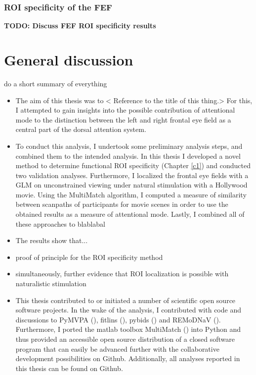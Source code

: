 \documentclass[a4paper, 12pt]{scrreprt}
\begin{document}
\subsection{ROI specificity of the FEF}
\textbf{TODO: Discuss FEF ROI specificity results}

\chapter{General discussion}\label{section:discussion}
do a short summary of everything

\begin{itemize}
	\item The aim of this thesis was to < Reference to the title of this thing.> For this, I attempted to gain insights into the possible contribution of attentional mode to the distinction between the left and right frontal eye field as a central part of the dorsal attention system.
	\item To conduct this analysis, I undertook some preliminary analysis steps, and combined them to the intended analysis. In this thesis I developed a novel method to determine functional ROI specificity (Chapter \ref{c1}) and conducted two validation analyses. Furthermore, I localized the frontal eye fields with a GLM on unconstrained viewing under natural stimulation with a Hollywood movie. Using the MultiMatch algorithm, I computed a measure of similarity between scanpaths of participants for movie scenes in order to use the obtained results as a measure of attentional mode. Lastly, I combined all of these approaches to blablabal
	\item The results show that...
	\item{proof of principle for the ROI specificity method}
	\item{simultaneously, further evidence that ROI localization is possible with naturalistic stimulation}
	\item{This thesis contributed to or initiated a number of scientific open source software projects. In the wake of the analysis, I contributed with code and discussions to PyMVPA (\cite{hanke2009pymvpa})}, fitlins (\cite{markiewicz_christopher_j_2019_2555453}), pybids (\cite{yarkoni_tal_2019_2555449}) and REMoDNaV (\cite{dar2019}). Furthermore, I ported the matlab toolbox MultiMatch (\cite{dewhurst2012depends}) into Python and thus provided an accessible open source distribution of a closed software program that can easily be advanced further with the collaborative development possibilities on Github. Additionally, all analyses reported in this thesis can be found on Github.
\end{itemize}
	 
\end{document}
